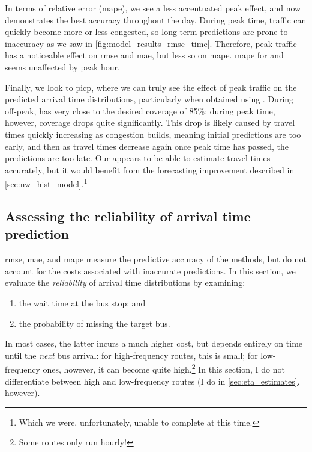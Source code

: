 In terms of relative error (\gls{mape}), we see a less accentuated peak effect, and now \Fpf{} demonstrates the best accuracy throughout the day. During peak time, traffic can quickly become more or less congested, so long-term predictions are prone to inaccuracy as we saw in \cref{fig:model_results_rmse_time}. Therefore, peak traffic has a noticeable effect on \gls{rmse} and \gls{mae}, but less so on \gls{mape}. \Gls{mape} for \Fsched{} and \Fhist{} seems unaffected by peak hour.


Finally, we look to \gls{picp}, where we can truly see the effect of peak traffic on the predicted arrival time distributions, particularly when obtained using \Fpf{}. During off-peak, \Fpf{} has very close to the desired coverage of 85\%; during peak time, however, coverage drops quite significantly. This drop is likely caused by travel times quickly increasing as congestion builds, meaning initial predictions are too early, and then as travel times decrease again once peak time has passed, the predictions are too late. Our \pf{} appears to be able to estimate travel times accurately, but it would benefit from the forecasting improvement described in \cref{sec:nw_hist_model}.\footnote{Which we were, unfortunately, unable to complete at this time.}




\subsection{Assessing the reliability of arrival time prediction}
\label{sec:prediction_model_comp_probs}

\Gls{rmse}, \gls{mae}, and \gls{mape} measure the predictive accuracy of the methods, but do not account for the costs associated with inaccurate predictions. In this section, we evaluate the \emph{reliability} of arrival time distributions by examining:
\begin{enumerate}
\item the wait time at the bus stop; and
\item the probability of missing the target bus.
\end{enumerate}
In most cases, the latter incurs a much higher cost, but depends entirely on time until the \emph{next} bus arrival: for high-frequency routes, this is small; for low-frequency ones, however, it can become quite high.\footnote{Some routes only run hourly!} In this section, I do not differentiate between high and low-frequency routes (I do in \cref{sec:eta_estimates}, however).


